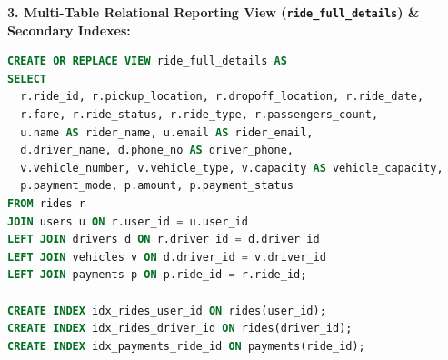 \textbf{3. Multi-Table Relational Reporting View (\texttt{ride\_full\_details}) \& Secondary Indexes:}
\begin{lstlisting}[language=SQL]
CREATE OR REPLACE VIEW ride_full_details AS
SELECT 
  r.ride_id, r.pickup_location, r.dropoff_location, r.ride_date,
  r.fare, r.ride_status, r.ride_type, r.passengers_count,
  u.name AS rider_name, u.email AS rider_email,
  d.driver_name, d.phone_no AS driver_phone,
  v.vehicle_number, v.vehicle_type, v.capacity AS vehicle_capacity,
  p.payment_mode, p.amount, p.payment_status
FROM rides r
JOIN users u ON r.user_id = u.user_id
LEFT JOIN drivers d ON r.driver_id = d.driver_id
LEFT JOIN vehicles v ON d.driver_id = v.driver_id
LEFT JOIN payments p ON p.ride_id = r.ride_id;

CREATE INDEX idx_rides_user_id ON rides(user_id);
CREATE INDEX idx_rides_driver_id ON rides(driver_id);
CREATE INDEX idx_payments_ride_id ON payments(ride_id);
\end{lstlisting}
